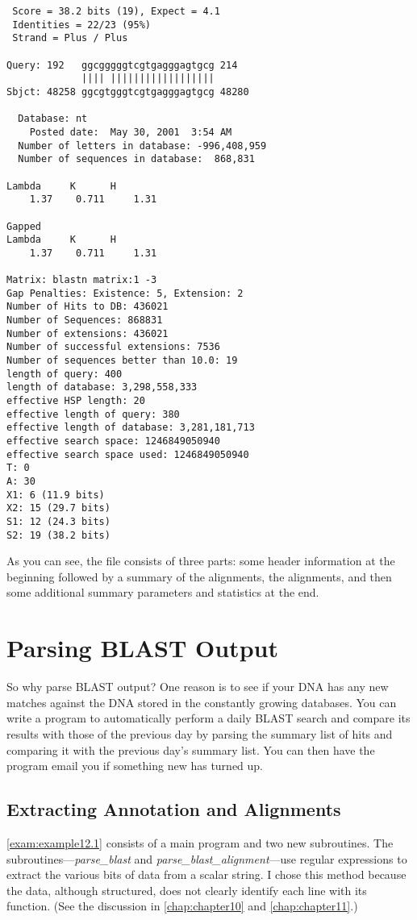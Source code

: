 \begin{lstlisting}
 Score = 38.2 bits (19), Expect = 4.1
 Identities = 22/23 (95%)
 Strand = Plus / Plus

Query: 192   ggcgggggtcgtgagggagtgcg 214
             |||| ||||||||||||||||||
Sbjct: 48258 ggcgtgggtcgtgagggagtgcg 48280

  Database: nt
    Posted date:  May 30, 2001  3:54 AM
  Number of letters in database: -996,408,959
  Number of sequences in database:  868,831

Lambda     K      H
    1.37    0.711     1.31

Gapped
Lambda     K      H
    1.37    0.711     1.31

Matrix: blastn matrix:1 -3
Gap Penalties: Existence: 5, Extension: 2
Number of Hits to DB: 436021
Number of Sequences: 868831
Number of extensions: 436021
Number of successful extensions: 7536
Number of sequences better than 10.0: 19
length of query: 400
length of database: 3,298,558,333
effective HSP length: 20
effective length of query: 380
effective length of database: 3,281,181,713
effective search space: 1246849050940
effective search space used: 1246849050940
T: 0
A: 30
X1: 6 (11.9 bits)
X2: 15 (29.7 bits)
S1: 12 (24.3 bits)
S2: 19 (38.2 bits)
\end{lstlisting}

As you can see, the file consists of three parts: some header information at the beginning followed by a summary of the alignments, the alignments, and then some additional summary parameters and statistics at the end. 

\section{Parsing BLAST Output}
So why parse BLAST output? One reason is to see if your DNA has any new matches against the DNA stored in the constantly growing databases. You can write a program to automatically perform a daily BLAST search and compare its results with those of the previous day by parsing the summary list of hits and comparing it with the previous day's summary list. You can then have the program email you if something new has turned up. 

\subsection{Extracting Annotation and Alignments}
\autoref{exam:example12.1} consists of a main program and two new subroutines. The subroutines—\textit{parse\_blast} and \textit{parse\_blast\_alignment}—use regular expressions to extract the various bits of data from a scalar string. I chose this method because the data, although structured, does not clearly identify each line with its function. (See the discussion in \autoref{chap:chapter10} and \autoref{chap:chapter11}.) 

